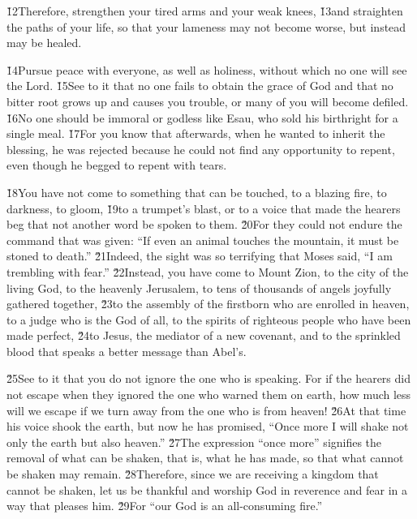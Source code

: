 \v{12}Therefore, strengthen your tired arms and your weak knees, \v{13}and straighten the paths of your life, so that your lameness may not become worse, but instead may be healed.

\v{14}Pursue peace with everyone, as well as holiness, without which no one will see the Lord. \v{15}See to it that no one fails to obtain the grace of God and that no bitter root grows up and causes you trouble, or many of you will become defiled. \v{16}No one should be immoral or godless like Esau, who sold his birthright for a single meal. \v{17}For you know that afterwards, when he wanted to inherit the blessing, he was rejected because he could not find any opportunity to repent, even though he begged to repent with tears.

\v{18}You have not come to something that can be touched, to a blazing fire, to darkness, to gloom, \v{19}to a trumpet's blast, or to a voice that made the hearers beg that not another word be spoken to them. \v{20}For they could not endure the command that was given: ``If even an animal touches the mountain, it must be stoned to death.'' \v{21}Indeed, the sight was so terrifying that Moses said, ``I am trembling with fear.'' \v{22}Instead, you have come to Mount Zion, to the city of the living God, to the heavenly Jerusalem, to tens of thousands of angels joyfully gathered together, \v{23}to the assembly of the firstborn who are enrolled in heaven, to a judge who is the God of all, to the spirits of righteous people who have been made perfect, \v{24}to Jesus, the mediator of a new covenant, and to the sprinkled blood that speaks a better message than Abel's.

\v{25}See to it that you do not ignore the one who is speaking. For if the hearers did not escape when they ignored the one who warned them on earth, how much less will we escape if we turn away from the one who is from heaven! \v{26}At that time his voice shook the earth, but now he has promised, ``Once more I will shake not only the earth but also heaven.'' \v{27}The expression ``once more'' signifies the removal of what can be shaken, that is, what he has made, so that what cannot be shaken may remain. \v{28}Therefore, since we are receiving a kingdom that cannot be shaken, let us be thankful and worship God in reverence and fear in a way that pleases him. \v{29}For ``our God is an all-consuming fire.''

